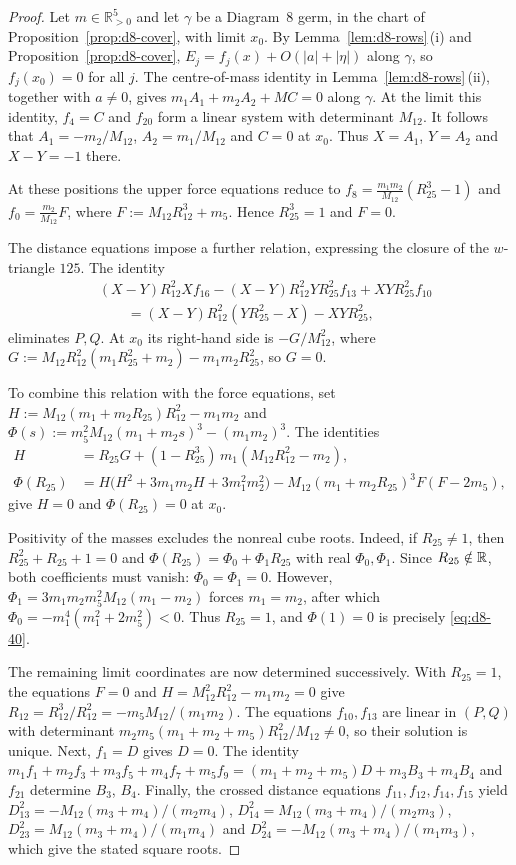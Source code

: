 \documentclass[Threeside,11pt]{article}
\theoremstyle{definition}
\theoremstyle{remark}
\numberwithin{equation}{section}
\theoremstyle{remark}
\newcommand{\Rp}{\mathbb{R}_{>0}}
\begin{document}
\begin{proof}
Let $m\in\Rp^5$ and let $\gamma$ be a Diagram~8 germ, in the chart of
Proposition~\ref{prop:d8-cover}, with limit $x_0$.
By Lemma~\ref{lem:d8-rows}\,(i) and Proposition~\ref{prop:d8-cover},
$E_j=f_j(x)+O(|a|+|\eta|)$ along $\gamma$, so $f_j(x_0)=0$ for all $j$.
The centre-of-mass identity in Lemma~\ref{lem:d8-rows}\,(ii), together with
$a\ne0$, gives $m_1A_1+m_2A_2+MC=0$ along $\gamma$.  At the limit this identity,
$f_4=C$ and $f_{20}$ form a linear system with determinant $M_{12}$.
It follows that $A_1=-m_2/M_{12}$, $A_2=m_1/M_{12}$ and $C=0$ at $x_0$.
Thus $X=A_1$, $Y=A_2$ and $X-Y=-1$ there.

At these positions the upper force equations reduce to
$f_8=\frac{m_1m_2}{M_{12}}(R_{25}^3-1)$ and $f_0=\frac{m_2}{M_{12}}F$,
where $F:=M_{12}R_{12}^3+m_5$.  Hence $R_{25}^3=1$ and $F=0$.

The distance equations impose a further relation, expressing the closure of
the $w$-triangle $125$.  The identity
\begin{align*}
  &(X-Y)R_{12}^2Xf_{16}-(X-Y)R_{12}^2YR_{25}^2f_{13}+XYR_{25}^2f_{10}\\
  &\qquad=(X-Y)R_{12}^2(YR_{25}^2-X)-XYR_{25}^2,
\end{align*}
eliminates $P,Q$.  At $x_0$ its right-hand side is $-G/M_{12}^2$, where
$G:=M_{12}R_{12}^2(m_1R_{25}^2+m_2)-m_1m_2R_{25}^2$, so $G=0$.

To combine this relation with the force equations, set
$H:=M_{12}(m_1+m_2R_{25})R_{12}^2-m_1m_2$ and
$\Phi(s):=m_5^2M_{12}(m_1+m_2s)^3-(m_1m_2)^3$.  The identities
\begin{align*}
  H&=R_{25}G+(1-R_{25}^3)\,m_1(M_{12}R_{12}^2-m_2),\\
  \Phi(R_{25})&=H\bigl(H^2+3m_1m_2H+3m_1^2m_2^2\bigr)
  -M_{12}(m_1+m_2R_{25})^3F(F-2m_5),
\end{align*}
give $H=0$ and $\Phi(R_{25})=0$ at $x_0$.

Positivity of the masses excludes the nonreal cube roots.  Indeed, if
$R_{25}\ne1$, then $R_{25}^2+R_{25}+1=0$ and
$\Phi(R_{25})=\Phi_0+\Phi_1R_{25}$ with real $\Phi_0,\Phi_1$.  Since
$R_{25}\notin\mathbb R$, both coefficients must vanish: $\Phi_0=\Phi_1=0$.
However, $\Phi_1=3m_1m_2m_5^2M_{12}(m_1-m_2)$ forces $m_1=m_2$, after which
$\Phi_0=-m_1^4(m_1^2+2m_5^2)<0$.  Thus $R_{25}=1$, and $\Phi(1)=0$ is precisely
\eqref{eq:d8-40}.

The remaining limit coordinates are now determined successively.  With $R_{25}=1$,
the equations $F=0$ and $H=M_{12}^2R_{12}^2-m_1m_2=0$ give
$R_{12}=R_{12}^3/R_{12}^2=-m_5M_{12}/(m_1m_2)$.  The equations $f_{10},f_{13}$
are linear in $(P,Q)$ with determinant
$m_2m_5(m_1+m_2+m_5)R_{12}^2/M_{12}\ne0$, so their solution is unique.
Next, $f_1=D$ gives $D=0$.  The identity
$m_1f_1+m_2f_3+m_3f_5+m_4f_7+m_5f_9=(m_1+m_2+m_5)D+m_3B_3+m_4B_4$
and $f_{21}$ determine $B_3$, $B_4$.  Finally, the crossed distance equations
$f_{11},f_{12},f_{14},f_{15}$ yield
$D_{13}^2=-M_{12}(m_3+m_4)/(m_2m_4)$, $D_{14}^2=M_{12}(m_3+m_4)/(m_2m_3)$,
$D_{23}^2=M_{12}(m_3+m_4)/(m_1m_4)$ and $D_{24}^2=-M_{12}(m_3+m_4)/(m_1m_3)$,
which give the stated square roots.
\end{proof}
\end{document}
